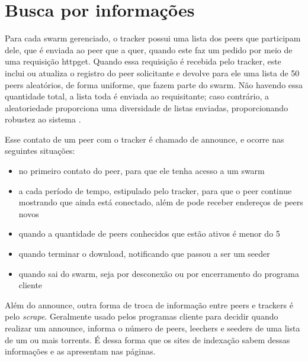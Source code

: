 \section{Busca por informações}

Para cada \gls*{swarm} gerenciado, o \gls*{tracker} possui uma lista dos \glspl*{peer}
que participam dele, que é enviada ao \gls*{peer} que a quer, quando este faz um pedido
por meio de uma requisição \gls{httpget}. Quando essa requisição é recebida pelo
\gls*{tracker}, este inclui ou atualiza o registro do \gls*{peer} solicitante e devolve
para ele uma lista de 50 \glspl*{peer} aleatórios, de forma uniforme, que fazem parte do
\gls*{swarm}. Não havendo essa quantidade total, a lista toda é enviada ao requisitante;
caso contrário, a aleatoriedade proporciona uma diversidade de listas enviadas,
proporcionando robustez ao sistema \cite{wikitheory:tracker-response}.

Esse contato de um \gls*{peer} com o \gls*{tracker} é chamado de \gls{announce}, e
ocorre nas seguintes situações:

\begin{itemize}
    \item no primeiro contato do \gls*{peer}, para que ele tenha acesso a um
        \gls*{swarm}

    \item a cada período de tempo, estipulado pelo tracker, para que o \gls*{peer}
        continue mostrando que ainda está conectado, além de pode receber endereços de
        \glspl*{peer} novos

    \item quando a quantidade de \glspl*{peer} conhecidos que estão ativos é menor do 5

    \item quando terminar o download, notificando que passou a ser um \gls*{seeder}

    \item quando sai do \gls*{swarm}, seja por desconexão ou por encerramento do
        programa cliente
\end{itemize}

Além do \gls*{announce}, outra forma de troca de informação entre \glspl*{peer} e
\glspl*{tracker} é pelo \emph{scrape}. Geralmente usado pelos programas cliente para
decidir quando realizar um \gls*{announce}, informa o número de \glspl*{peer},
\glspl*{leecher} e \glspl*{seeder} de uma lista de um ou mais \glspl*{torrent}. É dessa
forma que os sites de indexação sabem dessas informações e as apresentam nas páginas.

